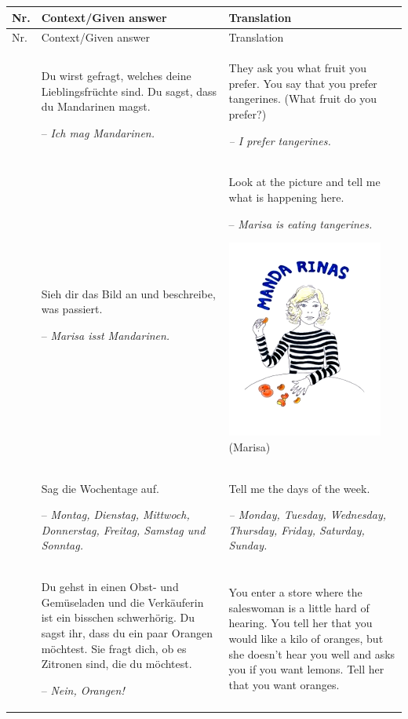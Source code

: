 \begin{xltabular}{\textwidth}{lQQ}

\lsptoprule
Nr. & Context\slash Given answer & Translation\\
\midrule
\endfirsthead
    \midrule
Nr. & Context\slash Given answer & Translation\\
		\midrule\endhead
    \endfoot
    \lspbottomrule
     & Du wirst gefragt, welches deine Lieblingsfrüchte sind. Du sagst, dass du Mandarinen magst.

-- \textit{Ich mag Mandarinen.} & They ask you what fruit you prefer. You say that you prefer tangerines. (What fruit do you prefer?)

{\itshape -- I prefer tangerines.}\\
 & Sieh dir das Bild an und beschreibe, was passiert.

-- \textit{Marisa isst Mandarinen.} & Look at the picture and tell me what is happening here.

-- \textit{Marisa is eating tangerines.}

\includegraphics[width=.3\textwidth]{figures/a08HabilAppendix-img001.png}
 (Marisa)\\
 & Sag die Wochentage auf.

-- \textit{Montag, Dienstag, Mittwoch, Donnerstag, Freitag, Samstag und Sonntag.} & Tell me the days of the week.

{\itshape -- Monday, Tuesday, Wednesday, Thursday, Friday, Saturday, Sunday.}\\
 & Du gehst in einen Obst- und Gemüseladen und die Verkäuferin ist ein bisschen schwerhörig. Du sagst ihr, dass du ein paar Orangen möchtest. Sie fragt dich, ob es Zitronen sind, die du möchtest.

-- \textit{Nein, Orangen!} & You enter a store where the saleswoman is a little hard of hearing. You tell her that you would like a kilo of oranges, but she doesn’t hear you well and asks you if you want lemons. Tell her that you want oranges.


\end{xltabular}
